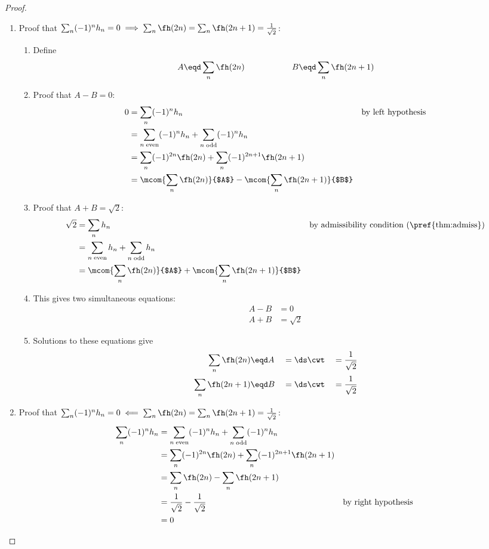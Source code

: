 \begin{proof}
\begin{enumerate}
\item Proof that
      $\sum_n (-1)^n  h_n  = 0
       \implies
       \sum_n \fh(2n) = \sum_n \fh(2n+1) = \frac{1}{\sqrt{2}}
      $:
\begin{enumerate}
\item Define
\[ A \eqd \sum_n \fh(2n) \hspace{2cm} B \eqd \sum_n \fh(2n+1) \]

\item Proof that $A-B=0$:
\begin{align*}
  0
    &= \sum_n (-1)^n  h_n
    && \text{by left hypothesis}
  \\&=   \sum_{n\mathrm{\;even}} (-1)^n  h_n
       + \sum_{n\mathrm{\;odd}} (-1)^n  h_n
  \\&=   \sum_n (-1)^{2n}   \fh(2n)
       + \sum_n (-1)^{2n+1} \fh(2n+1)
  \\&=   \mcom{\sum_n \fh(2n)}{$A$} - \mcom{\sum_n \fh(2n+1)}{$B$}
\end{align*}

\item Proof that $A+B=\sqrt{2}$:
\begin{align*}
  \sqrt{2}
    &= \sum_n  h_n
    && \text{by admissibility condition (\pref{thm:admiss})}
  \\&= \sum_{n\mathrm{\;even}}  h_n  + \sum_{n\mathrm{\;odd}}  h_n
  \\&= \mcom{\sum_n \fh(2n)}{$A$} + \mcom{\sum_n \fh(2n+1)}{$B$}
\end{align*}

\item This gives two simultaneous equations:
  \begin{align*}
    A - B &= 0 \\
    A + B &= \sqrt{2}
  \end{align*}

\item Solutions to these equations give
  \begin{align*}
   \sum_n \fh(2n  )  &\eqd A &&= \ds \cwt  &&= \frac{1}{\sqrt{2}} \\
   \sum_n \fh(2n+1)  &\eqd B &&= \ds \cwt  &&= \frac{1}{\sqrt{2}}
  \end{align*}
\end{enumerate}

\item Proof that
      $\sum_n (-1)^n  h_n  = 0
       \impliedby
       \sum_n \fh(2n) = \sum_n \fh(2n+1) = \frac{1}{\sqrt{2}}
      $:
\begin{align*}
  \sum_n (-1)^n  h_n
    &= \sum_{n\;\mathrm{even}} (-1)^n  h_n
      +\sum_{n\;\mathrm{odd}}  (-1)^n  h_n
  \\&= \sum_n (-1)^{2n  } \fh(2n  ) + \sum_n (-1)^{2n+1} \fh(2n+1)
  \\&= \sum_n \fh(2n  ) -\sum_n \fh(2n+1)
  \\&= \frac{1}{\sqrt{2}} - \frac{1}{\sqrt{2}}
    && \text{by right hypothesis}
  \\&= 0
\end{align*}
\end{enumerate}

\end{proof}





